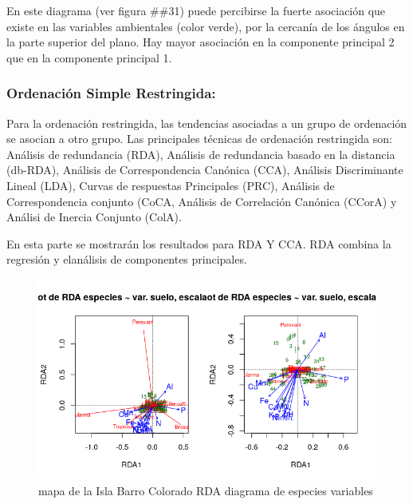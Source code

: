\documentclass[11pt,]{article}
\begin{document}
En este diagrama (ver figura \#\#31) puede percibirse la fuerte
asociación que existe en las variables ambientales (color verde), por la
cercanía de los ángulos en la parte superior del plano. Hay mayor
asociación en la componente principal 2 que en la componente principal
1.

\subsubsection{Ordenación Simple
Restringida:}\label{ordenaciuxf3n-simple-restringida}

Para la ordenación restringida, las tendencias asociadas a un grupo de
ordenación se asocian a otro grupo. Las principales técnicas de
ordenación restringida son: Análisis de redundancia (RDA), Análisis de
redundancia basado en la distancia (db-RDA), Análisis de Correspondencia
Canónica (CCA), Análisis Discriminante Lineal (LDA), Curvas de
respuestas Principales (PRC), Análisis de Correspondencia conjunto
(CoCA, Análisis de Correlación Canónica (CCorA) y Análisi de Inercia
Conjunto (ColA).

En esta parte se mostrarán los resultados para RDA Y CCA. RDA combina la
regresión y elanálisis de componentes principales.

\begin{figure}
\centering
\includegraphics[width=1.00000\textwidth]{rda_escala_especies.png}
\caption{mapa de la Isla Barro Colorado RDA diagrama de especies
variables\label{fig:bci_map}}
\end{figure}
\end{document}
